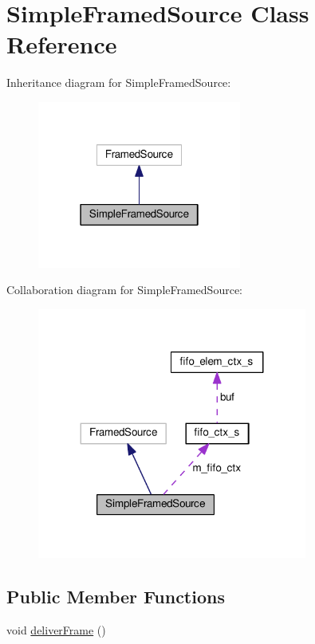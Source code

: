 \hypertarget{classSimpleFramedSource}{}\section{Simple\+Framed\+Source Class Reference}
\label{classSimpleFramedSource}


Inheritance diagram for Simple\+Framed\+Source\+:\nopagebreak
\begin{figure}[H]
\begin{center}
\leavevmode
\includegraphics[width=190pt]{classSimpleFramedSource__inherit__graph}
\end{center}
\end{figure}


Collaboration diagram for Simple\+Framed\+Source\+:\nopagebreak
\begin{figure}[H]
\begin{center}
\leavevmode
\includegraphics[width=251pt]{classSimpleFramedSource__coll__graph}
\end{center}
\end{figure}
\subsection*{Public Member Functions}
\begin{DoxyCompactItemize}
\item 
void \hyperlink{classSimpleFramedSource_aeadfcbc8eeb78ada43c9c247e6a707af}{deliver\+Frame} ()
\end{DoxyCompactItemize}
